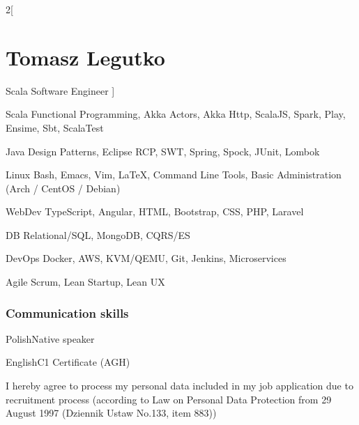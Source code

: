 \documentclass{tccv}
\begin{document}
\begin{multicols}{2}[
\part{Tomasz Legutko}{Scala Software Engineer}
]
\begin{factlist}

\item{Scala}
     {Functional Programming, Akka Actors, Akka Http, ScalaJS, Spark, Play, Ensime, Sbt, ScalaTest} 

\item{Java}
     {Design Patterns, Eclipse RCP, SWT, Spring, Spock, JUnit, Lombok}

\item{Linux}
     {Bash, Emacs, Vim, \LaTeX, Command Line Tools, Basic Administration (Arch / CentOS / Debian)}
     
\item{WebDev}
     {TypeScript, Angular, HTML, Bootstrap, CSS, PHP, Laravel}

\item{DB}
  {Relational/SQL, MongoDB, CQRS/ES}

\item{DevOps}
     {Docker, AWS, KVM/QEMU, Git, Jenkins, Microservices}

\item{Agile}
     {Scrum, Lean Startup, Lean UX}

\end{factlist}

\section{Communication skills}

\begin{factlist}
\item{Polish}{Native speaker}
\item{English}{C1 Certificate (AGH)}
\end{factlist}

\end{multicols}

I hereby agree to process my personal data included in my job application due to recruitment process
(according to Law on Personal Data Protection from 29 August 1997 (Dziennik Ustaw No.133, item 883))
\end{document}
